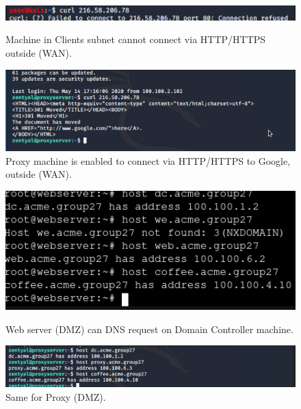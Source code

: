 \begin{figure}[H]
\centering
\begin{minipage}{.5\textwidth}
  \centering
  \includegraphics[width=1\textwidth]{clientCANNOTGoOut.png}
  \caption[a]{Machine in Clients subnet cannot connect via HTTP/HTTPS outside (WAN).}\label{fig:5}
\end{minipage}%
\begin{minipage}{.5\textwidth}
  \centering
  \includegraphics[width=1\textwidth]{proxyCanGoOutToHaveFun.png}
  \caption[a]{Proxy machine is enabled to connect via HTTP/HTTPS to Google, outside (WAN).}\label{fig:6}
\end{minipage}
\end{figure}

\begin{figure}[H]
\centering
\begin{minipage}{.5\textwidth}
  \centering
  \includegraphics[width=1\textwidth]{dnsWorkingWebServer.png}
  \caption[a]{Web server (DMZ) can DNS request on Domain Controller machine.}\label{fig:7}
\end{minipage}%
\begin{minipage}{.5\textwidth}
  \centering
  \includegraphics[width=1\textwidth]{DMZCanuseDNSService.png}
  \caption[a]{Same for Proxy (DMZ).}\label{fig:8}
\end{minipage}
\end{figure}

